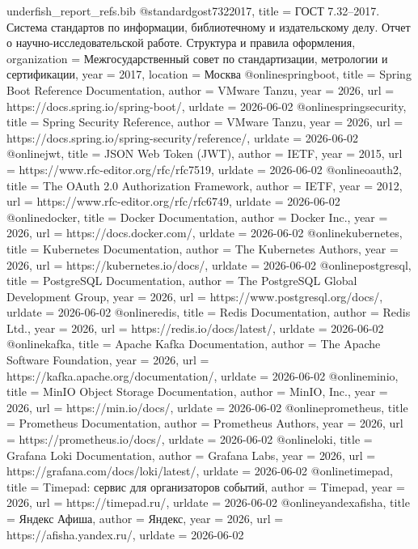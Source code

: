 \begin{filecontents*}{underfish_report_refs.bib}
@standard{gost7322017,
  title        = {ГОСТ 7.32--2017. Система стандартов по информации, библиотечному и издательскому делу. Отчет о научно-исследовательской работе. Структура и правила оформления},
  organization = {Межгосударственный совет по стандартизации, метрологии и сертификации},
  year         = {2017},
  location     = {Москва}
}
@online{springboot,
  title   = {Spring Boot Reference Documentation},
  author  = {{VMware Tanzu}},
  year    = {2026},
  url     = {https://docs.spring.io/spring-boot/},
  urldate = {2026-06-02}
}
@online{springsecurity,
  title   = {Spring Security Reference},
  author  = {{VMware Tanzu}},
  year    = {2026},
  url     = {https://docs.spring.io/spring-security/reference/},
  urldate = {2026-06-02}
}
@online{jwt,
  title   = {JSON Web Token (JWT)},
  author  = {{IETF}},
  year    = {2015},
  url     = {https://www.rfc-editor.org/rfc/rfc7519},
  urldate = {2026-06-02}
}
@online{oauth2,
  title   = {The OAuth 2.0 Authorization Framework},
  author  = {{IETF}},
  year    = {2012},
  url     = {https://www.rfc-editor.org/rfc/rfc6749},
  urldate = {2026-06-02}
}
@online{docker,
  title   = {Docker Documentation},
  author  = {{Docker Inc.}},
  year    = {2026},
  url     = {https://docs.docker.com/},
  urldate = {2026-06-02}
}
@online{kubernetes,
  title   = {Kubernetes Documentation},
  author  = {{The Kubernetes Authors}},
  year    = {2026},
  url     = {https://kubernetes.io/docs/},
  urldate = {2026-06-02}
}
@online{postgresql,
  title   = {PostgreSQL Documentation},
  author  = {{The PostgreSQL Global Development Group}},
  year    = {2026},
  url     = {https://www.postgresql.org/docs/},
  urldate = {2026-06-02}
}
@online{redis,
  title   = {Redis Documentation},
  author  = {{Redis Ltd.}},
  year    = {2026},
  url     = {https://redis.io/docs/latest/},
  urldate = {2026-06-02}
}
@online{kafka,
  title   = {Apache Kafka Documentation},
  author  = {{The Apache Software Foundation}},
  year    = {2026},
  url     = {https://kafka.apache.org/documentation/},
  urldate = {2026-06-02}
}
@online{minio,
  title   = {MinIO Object Storage Documentation},
  author  = {{MinIO, Inc.}},
  year    = {2026},
  url     = {https://min.io/docs/},
  urldate = {2026-06-02}
}
@online{prometheus,
  title   = {Prometheus Documentation},
  author  = {{Prometheus Authors}},
  year    = {2026},
  url     = {https://prometheus.io/docs/},
  urldate = {2026-06-02}
}
@online{loki,
  title   = {Grafana Loki Documentation},
  author  = {{Grafana Labs}},
  year    = {2026},
  url     = {https://grafana.com/docs/loki/latest/},
  urldate = {2026-06-02}
}
@online{timepad,
  title   = {Timepad: сервис для организаторов событий},
  author  = {{Timepad}},
  year    = {2026},
  url     = {https://timepad.ru/},
  urldate = {2026-06-02}
}
@online{yandexafisha,
  title   = {Яндекс Афиша},
  author  = {{Яндекс}},
  year    = {2026},
  url     = {https://afisha.yandex.ru/},
  urldate = {2026-06-02}
}
\end{filecontents*}

